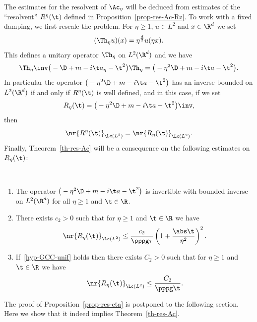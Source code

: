 The estimates for the resolvent of $\Ac_\eta$ will be deduced from estimates of the ``resolvent'' $R^\eta(\t)$ defined in Proposition~\ref{prop-res-Ac-Rz}. To work with a fixed damping, we first rescale the problem. For $\eta \geq 1$, $u \in L^2$ and $x \in \R^d$ we set
\[
(\Th_\eta u)(x) = \eta^{\frac d 2} u(\eta x).
\]
This defines a unitary operator $\Th_\eta$ on $L^2(\R^d)$ and we have
\[
\Th_\eta\inv \big(-\D + m -i \t a_\eta - \t^2\big) \Th_\eta = \big(-\eta^2 \D + m -i \t a - \t^2\big).
\]
In particular the operator $\big(-\eta^2 \D + m -i \t a - \t^2\big)$ has an inverse bounded on $L^2(\R^d)$ if and only if $R^\eta(\t)$ is well defined, and in this case, if we set
\begin{equation}\label{def-Reta}
R_\eta(\t) = \big(-\eta^2 \D + m -i \t a - \t^2\big)\inv,
\end{equation}
then
\begin{equation}\label{eq-norm-res-eta}
\nr{R^\eta(\t)}_{\Lc(L^2)} = \nr{R_\eta(\t)}_{\Lc(L^2)}.
\end{equation}
Finally, Theorem~\ref{th-res-Ac} will be a consequence on the following estimates on $R_\eta(\t)$:

\let\oldpointir\pointir
\renewcommand*{\pointir}{}
\begin{prop}\label{prop-res-eta}\ 
\begin{enumerate}%
\item The operator ${\big(-\eta^2 \D + m -i \t a - \t^2\big)}$ is invertible with bounded inverse on $L^2(\R^d)$ for all $\eta \geq 1$ and $\t \in \R$.
\item There exists $c_2 > 0$ such that for $\eta \geq 1$ and $\t \in \R$ we have
\[
\nr{R_\eta(\t)}_{\Lc(L^2)} \leq \frac {c_2}{\pppg \tau} \left(1 + \frac {\abs \t} {\eta^2} \right)^2.
\]
\item If~\eqref{hyp-GCC-unif} holds then there exists $C_2 > 0$ such that for $\eta \geq 1$ and $\t \in \R$ we have
\[
\nr{R_\eta(\t)}_{\Lc(L^2)} \leq \frac {C_2} {\pppg \t}.
\]
\end{enumerate}
\end{prop}
\let\pointir\oldpointir

The proof of Proposition~\ref{prop-res-eta} is postponed to the following section. Here we show that it indeed implies Theorem~\ref{th-res-Ac}.

